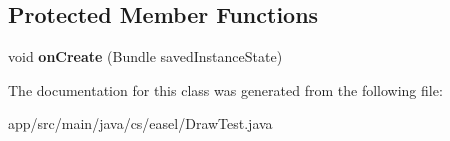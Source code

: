 \subsection*{Protected Member Functions}
\begin{DoxyCompactItemize}
\item 
\hypertarget{classcs_1_1easel_1_1_draw_test_ad76a0e6568b82a0070545436c022bb49}{void {\bfseries on\+Create} (Bundle saved\+Instance\+State)}\label{classcs_1_1easel_1_1_draw_test_ad76a0e6568b82a0070545436c022bb49}

\end{DoxyCompactItemize}


The documentation for this class was generated from the following file\+:\begin{DoxyCompactItemize}
\item 
app/src/main/java/cs/easel/Draw\+Test.\+java\end{DoxyCompactItemize}
